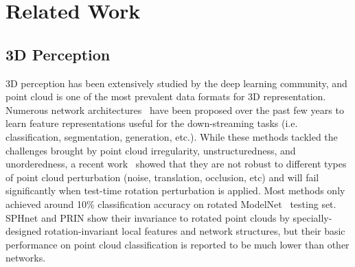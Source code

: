 \documentclass{article}
\begin{document}


\section{Related Work}

\subsection{3D Perception}

3D perception has been extensively studied by the deep learning community, and point cloud is one of the most prevalent data formats for 3D representation. Numerous network architectures~\cite{Qi2017pointnet, qi2017pointnet2, Wang2019-dgcnn, Li2018-PointCNN, Wu2019-pointconv, Liu2019-densepoint} have been proposed over the past few years to learn feature representations useful for the down-streaming tasks (i.e. classification, segmentation, generation, etc.). While these methods tackled the challenges brought by point cloud irregularity, unstructuredness, and unorderedness, a recent work~\cite{taghanaki2020robustpointset} showed that they are not robust to different types of point cloud perturbation (noise, translation, occlusion, etc) and will fail significantly when test-time rotation perturbation is applied. Most methods only achieved around 10\% classification accuracy on rotated ModelNet~\cite{Wu2015-3dshapenet} testing set. 
SPHnet \cite{Poulenard2019-sphnet} and PRIN \cite{You2021-prin} show their invariance to rotated point clouds by specially-designed rotation-invariant local features and network structures, but their basic performance on point cloud classification is reported to be much lower than other networks. 
\end{document}
